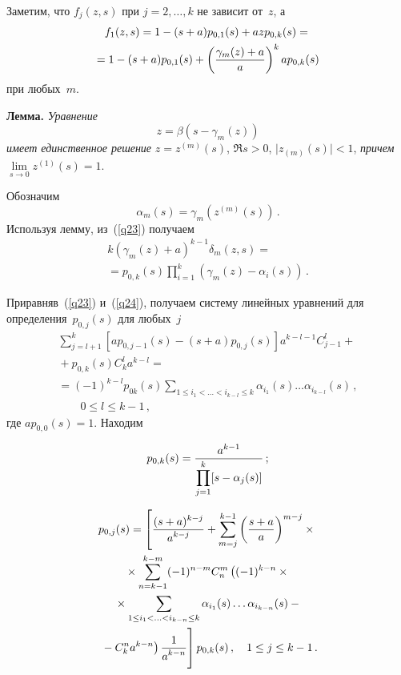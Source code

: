 \begin{multicols}{2}
\noindent
Заметим, что $f_{j}(z,s)$ при  $j=2, \ldots , k$ не зависит от~$z$, а
\begin{multline*}
f_{1}(z,s)=1-(s+a)p_{0,1}(s)+azp_{0,k}(s)={}\\
=1-(s+a)p_{0,1}(s)+\left(\displaystyle\frac{\displaystyle \gamma_{m}(z)+a\mathstrut}{\displaystyle a\mathstrut}\right)^{k}ap_{0,k}(s)
\end{multline*}
при любых~$m$.

\smallskip

\noindent
\textbf{Лемма.} \textit{Уравнение}
$$
z=\beta(s-\gamma_{m}(z))
$$
\textit{имеет единственное решение} $z=z^{(m)}(s)$,  $\Re s>0$, $\vert z_{(m)}(s)\vert <1$, \textit{причем}
$\lim\limits_{s\rightarrow0}z^{(1)}(s)=1$.

\smallskip

Обозначим
$$
\alpha_{m}(s)=\gamma_{m}(z^{(m)}(s))\,.
$$
Используя лемму, из~(\ref{q23}) получаем
\begin{multline}
k(\gamma_{m}(z)+a)^{k-1}\delta_{m}(z,s)={}\\
{}=p_{0,k}(s)\prod_{i=1}^{k}(\gamma_{m}(z)-\alpha_{i}(s))\,.
\label{q24}
\end{multline}

Приравняв~(\ref{q23}) и~(\ref{q24}), получаем систему линейных уравнений для
определения~$p_{0,j}(s)$ для любых~$j$
\begin{multline*}
\sum_{j=l+1}^{k}[ap_{0,j-1}(s)-(s+a)p_{0,j}(s)]a^{k-l-1}C^{l}_{j-1}+{}\\
{}+p_{0,k}(s)C_{k}^{l}a^{k-l}={}\\
{}=(-1)^{k-l}p_{0k}(s)\sum_{1\leq i_{1}<\ldots<i_{k-l}\leq
k}\alpha_{i_{1}}(s)\ldots\alpha_{i_{k-l}}(s)\,,\\
\qquad  0\leq l \leq k-1\,, 
\end{multline*}
где $ap_{0,0}(s)=1$.
Находим
\vspace*{2pt}

\noindent
$$
p_{0,k}(s)=\displaystyle\frac{\displaystyle a^{k-1}\mathstrut}{\displaystyle \prod\limits_{j=1}^{k}[s-\alpha_{j}(s)]\mathstrut}\,;
$$

\vspace*{-14pt}

\noindent
\begin{multline*}
p_{0,j}(s)=\left[\fr{(s+a)^{k-j}}{a^{k-j}}+\sum_{m=j}^{k-1}\left(\fr{s+a}{a}\right)^{m-j}\times{}\right.\\
\left.{}\times
\sum_{n=k-1}^{k-m}(-1)^{n-m}C_{n}^{m}
\left(
(-1)^{k-n}\times{}\right.\right.\\
{}\times
\sum_{1\leq i_{1}<\ldots<i_{k-n}\leq k}\alpha_{i_{1}}(s)\ldots\alpha_{i_{k-n}}(s)-{}\\
\left.\left.{}-C_{k}^{n}a^{k-n}\right)
\fr{1}{a^{k-n}}
\vphantom{\sum_{m=j}^{k-1}}
\right]\vphantom{\sum_{m=j}^{k-1}}
p_{0,k}(s)\,,\quad  1\leq j \leq k-1\,.
\end{multline*}


\end{multicols}
